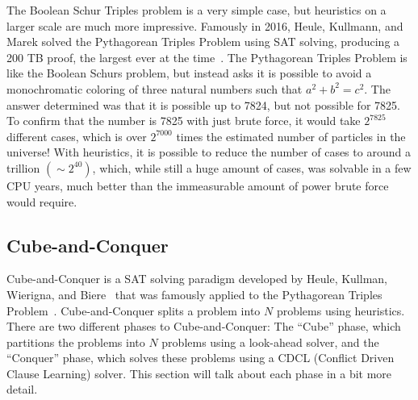 \documentclass[12pt]{article}
\theoremstyle{definition}
\begin{document}
The Boolean Schur Triples problem is a very simple case, but heuristics on a larger scale are much more impressive. Famously in 2016, Heule, Kullmann, and Marek solved the Pythagorean Triples Problem using SAT solving, producing a 200 TB proof, the largest ever at the time~\cite{DBLP:journals/corr/HeuleKM16}. The Pythagorean Triples Problem is like the Boolean Schurs problem, but instead asks it is possible to avoid a monochromatic coloring of three natural numbers such that $a^2+b^2 = c^2$. The answer determined was that it is possible up to 7824, but not possible for 7825. To confirm that the number is 7825 with just brute force, it would take $2^{7825}$ different cases, which is over $2^{7000}$ times the estimated number of particles in the universe! With heuristics, it is possible to reduce the number of cases to around a trillion $(\sim 2^{40})$, which, while still a huge amount of cases, was solvable in a few CPU years, much better than the immeasurable amount of power brute force would require.

\subsection{Cube-and-Conquer} \label{subsec:cnc}
Cube-and-Conquer is a SAT solving paradigm developed by Heule, Kullman, Wierigna, and Biere~\cite{HeuleKWB12} that was famously applied to the Pythagorean Triples Problem~\cite{DBLP:journals/corr/HeuleKM16}. Cube-and-Conquer splits a problem into $N$ problems using heuristics. There are two different phases to Cube-and-Conquer: The ``Cube'' phase, which partitions the problems into $N$ problems using a look-ahead solver, and the ``Conquer'' phase, which solves these problems using a CDCL (Conflict Driven Clause Learning) solver. This section will talk about each phase in a bit more detail. 
\end{document}
